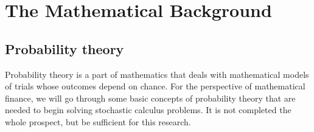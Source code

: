 \chapter{The Mathematical Background}
\label{ch:MB}

\section{Probability theory}

Probability theory is a part of mathematics that deals with mathematical models of trials
whose outcomes depend on chance. For the perspective of mathematical finance, we will go through
some basic concepts of probability theory that are needed to begin solving stochastic calculus
problems. It is not completed the whole prospect, but be sufficient for this research. %


